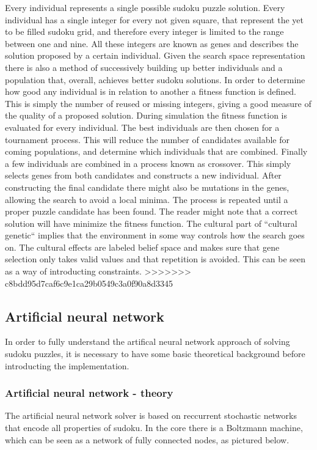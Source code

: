 \documentclass[a4paper,11pt]{kth-mag}
\begin{document}
Every individual represents a single possible sudoku puzzle solution.
Every individual has a single integer for every not given square, that represent the yet to be filled sudoku grid, and therefore every integer is limited to the range between one and nine.
All these integers are known as genes and describes the solution proposed by a certain individual. \newline
Given the search space representation there is also a method of successively building up better individuals and a population that, overall, achieves better sudoku solutions.
In order to determine how good any individual is in relation to another a fitness function is defined.
This is simply the number of reused or missing integers, giving a good measure of the quality of a proposed solution.
During simulation the fitness function is evaluated for every individual.
The best individuals are then chosen for a tournament process.
This will reduce the number of candidates available for coming populations, and determine which individuals that are combined.
Finally a few individuals are combined in a process known as crossover.
This simply selects genes from both candidates and constructs a new individual.
After constructing the final candidate there might also be mutations in the genes, allowing the search to avoid a local minima.
The process is repeated until a proper puzzle candidate has been found.
The reader might note that a correct solution will have minimize the fitness function. \newline
The cultural part of ``cultural genetic`` implies that the environment in some way controls how the search goes on.
The cultural effects are labeled belief space and makes sure that gene selection only takes valid values and that repetition is avoided.
This can be seen as a way of introducting constraints.
>>>>>>> c8bdd95d7caf6c9e1ca29b0549c3a0f90a8d3345

\subsection{Artificial neural network}
In order to fully understand the artifical neural network approach of solving sudoku puzzles, it is necessary to have some basic theoretical background before introducting the implementation.

\subsubsection{Artificial neural network - theory}
The artificial neural network solver is based on reccurrent stochastic networks that encode all properties of sudoku. In the core there is a Boltzmann machine, which can be seen as a network of fully connected nodes, as pictured below.
\end{document}

